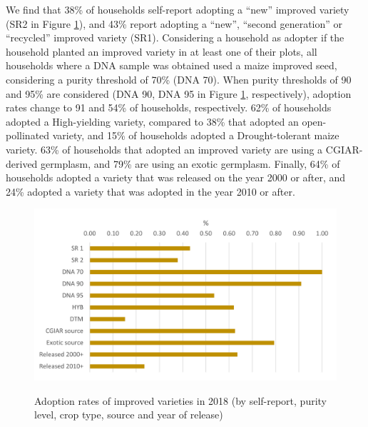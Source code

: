 \documentclass{article}
\begin{document}
We find that 38\% of households self-report adopting a “new” improved variety (SR2 in Figure \ref{fig:adoption_r4}), and 43\% report adopting a “new”, “second generation” or “recycled” improved variety (SR1). Considering a household as adopter if the household planted an improved variety in at least one of their plots, all households where a DNA sample was obtained used a maize improved seed, considering a purity threshold of 70\% (DNA 70). When purity thresholds of 90 and 95\% are considered (DNA 90, DNA 95 in Figure \ref{fig:adoption_r4}, respectively), adoption rates change to 91 and 54\% of households, respectively. 62\% of households adopted a High-yielding variety, compared to 38\% that adopted an open-pollinated variety, and 15\% of households adopted a Drought-tolerant maize variety. 63\% of households that adopted an improved variety are using a CGIAR-derived germplasm, and 79\% are using an exotic germplasm. Finally, 64\% of households adopted a variety that was released on the year 2000 or after, and 24\% adopted a variety that was adopted in the year 2010 or after.

\begin{figure}
    \centering
    \caption{Adoption rates of improved varieties in 2018 (by self-report, purity level, crop type, source and year of release)}
    \includegraphics{results/figures/adoption_r4.png}
    \label{fig:adoption_r4}
\end{figure}
\end{document}
